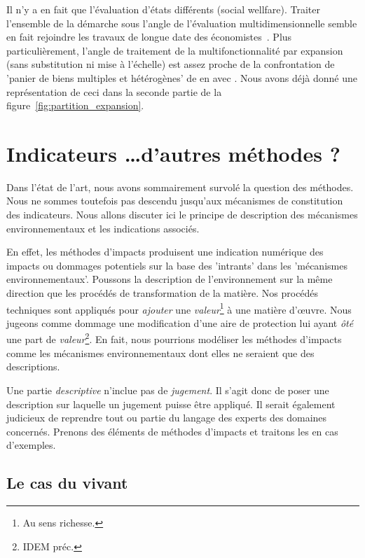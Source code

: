 Il n'y a en fait que l'évaluation d'états différents (social wellfare).
Traiter l'ensemble de la démarche sous l'angle de l'évaluation multidimensionnelle semble en fait rejoindre les travaux de longue date des économistes~\cite{arrow_determination_1952}.
Plus particulièrement, l'angle de traitement de la multifonctionnalité par expansion (sans substitution ni mise à l'échelle) est assez proche de la confrontation de 'panier de biens multiples et hétérogènes' de \citeauthor{arrow_determination_1952} en \citeyear{arrow_determination_1952} avec .
Nous avons déjà donné une représentation de ceci dans la seconde partie de la figure~\ref{fig:partition_expansion}.

\section{Indicateurs \ldots d'autres méthodes ?}
Dans l'état de l'art, nous avons sommairement survolé la question des méthodes.
Nous ne sommes toutefois pas descendu jusqu'aux mécanismes de constitution des indicateurs.
Nous allons discuter ici le principe de description des mécanismes environnementaux et les indications associés.

En effet, les méthodes d'impacts produisent une indication numérique des impacts ou dommages potentiels sur la base des 'intrants' dans les 'mécanismes environnementaux'.
Poussons la description de l'environnement sur la même direction que les procédés de transformation de la matière.
Nos procédés techniques sont appliqués pour \emph{ajouter} une \emph{valeur}\footnote{Au sens richesse.} à une matière d’œuvre.
Nous jugeons comme dommage une modification d'une aire de protection lui ayant \emph{ôté} une part de \emph{valeur}\footnote{IDEM préc.}.
En fait, nous pourrions modéliser les méthodes d'impacts comme les mécanismes environnementaux dont elles ne seraient que des descriptions.

Une partie \emph{descriptive} n'inclue pas de \emph{jugement}.
Il s'agit donc de poser une description sur laquelle un jugement puisse être appliqué.
Il serait également judicieux de reprendre tout ou partie du langage des experts des domaines concernés.
Prenons des éléments de méthodes d'impacts et traitons les en cas d'exemples.

\subsection{Le cas du vivant}

